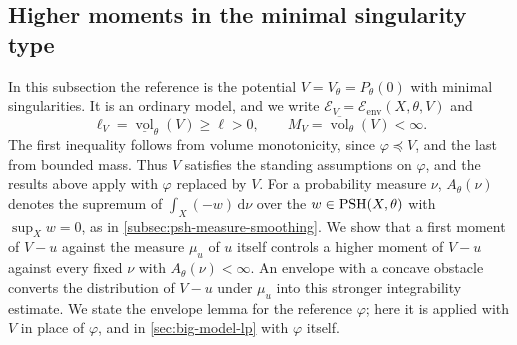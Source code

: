 \subsection{Higher moments in the minimal singularity type}
\label{sec:big-minimal-moments}

In this subsection the reference is the potential $V=V_\theta=P_\theta(0)$ with minimal singularities. It is an ordinary model, and we write $\mathcal E_V=\mathcal E_{\mathrm{env}}(X,\theta,V)$ and
\[
 \ell_V=\underline{\operatorname{vol}}_\theta(V)\geq\ell>0,
 \qquad M_V=\overline{\operatorname{vol}}_\theta(V)<\infty.
\]
The first inequality follows from volume monotonicity, since $\varphi\preceq V$, and the last from bounded mass. Thus $V$ satisfies the standing assumptions on $\varphi$, and the results above apply with $\varphi$ replaced by $V$. For a probability measure $\nu$, $A_\theta(\nu)$ denotes the supremum of $\int_X(-w)\,\mathrm{d}\nu$ over the $w\in\mathrm{PSH}(X,\theta)$ with $\sup_Xw=0$, as in \cref{subsec:psh-measure-smoothing}. We show that a first moment of $V-u$ against the measure $\mu_u$ of $u$ itself controls a higher moment of $V-u$ against every fixed $\nu$ with $A_\theta(\nu)<\infty$. An envelope with a concave obstacle converts the distribution of $V-u$ under $\mu_u$ into this stronger integrability estimate. We state the envelope lemma for the reference $\varphi$; here it is applied with $V$ in place of $\varphi$, and in \cref{sec:big-model-lp} with $\varphi$ itself.

